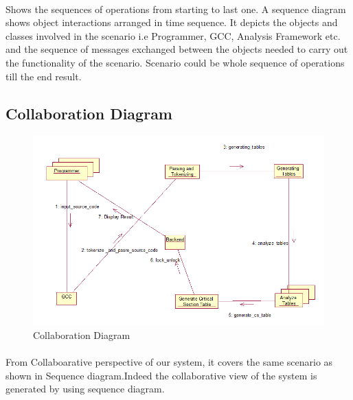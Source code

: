 \paragraph{}
Shows the sequences of operations from starting to last one. A sequence diagram shows object interactions arranged in time sequence. It depicts the objects and classes involved in the scenario i.e Programmer, GCC, Analysis Framework etc. and the sequence of messages exchanged between the objects needed to carry out the functionality of the scenario. Scenario could be whole sequence of operations till the end result.  

\subsection{Collaboration Diagram}
\begin{figure}[H]
\centering
\includegraphics[scale=0.6]{collaboration.png}
\caption{Collaboration Diagram}
\label{<<Label>>}
\end{figure}
\paragraph{}
From Collaboarative perspective of our system, it covers the same scenario as shown in Sequence diagram.Indeed the collaborative view of the system is generated by using sequence diagram. 

